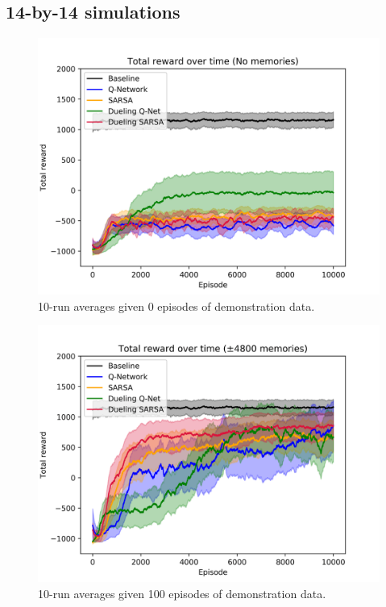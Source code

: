 \subsection{14-by-14 simulations}
\begin{figure}[H]
    \centering
    \includegraphics[width=\linewidth]{img/results/14-sized/total_rewards_0m-min.png}
    \caption{10-run averages given 0 episodes of demonstration data.}
    \label{fig:14sized-nomem}
\end{figure}
\begin{figure}[H]
    \centering
    \includegraphics[width=\linewidth]{img/results/14-sized/total_rewards_100m-min.png}
    \caption{10-run averages given 100 episodes of demonstration data.}
    \label{fig:14sized-100mem}
\end{figure}

